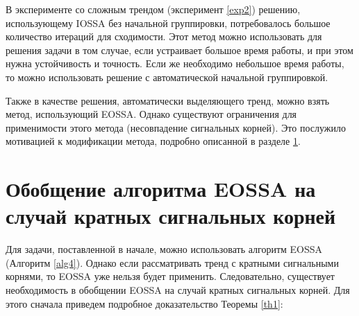 \documentclass[specialist, substylefile = spbureport.rtx, subf,href,colorlinks=true, 12pt]{disser}
\theoremstyle{definition}
\begin{document}
В эксперименте со сложным трендом (эксперимент \ref{exp2}) решению, использующему IOSSA без начальной группировки, потребовалось большое количество итераций для сходимости. Этот метод можно использовать для решения задачи в том случае, если устраивает большое время работы, и при этом нужна устойчивость и точность. Если же необходимо небольшое время работы, то можно использовать решение с автоматической начальной группировкой.

Также в качестве решения, автоматически выделяющего тренд, можно взять метод, использующий EOSSA. Однако существуют ограничения для применимости этого метода (несовпадение сигнальных корней). Это послужило мотивацией к модификации метода, подробно описанной в разделе \ref{ch3}.

\chapter{Обобщение алгоритма EOSSA на случай кратных сигнальных корней}
\label{ch3}
Для задачи, поставленной в начале, можно использовать алгоритм EOSSA (Алгоритм \ref{alg4}). Однако если рассматривать тренд с кратными сигнальными корнями, то EOSSA уже нельзя будет применить. Следовательно, существует необходимость в обобщении EOSSA на случай кратных сигнальных корней. Для этого сначала приведем подробное доказательство Теоремы \ref{th1}:
\end{document}
